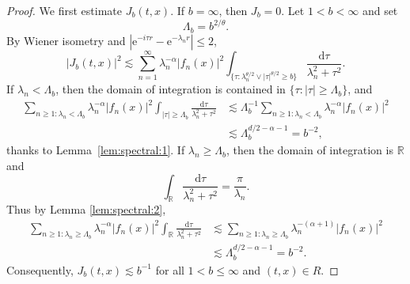 \documentclass[reqno]{amsart}
\DeclareMathOperator{\Var}{Var}
\newcommand{\R}{\mathbb R}
\renewcommand{\d}{\mathrm d}
\newcommand{\e}{\mathrm e}
\newcommand{\1}{\mathbf 1}
\numberwithin{equation}{section}
\theoremstyle{definition}
\begin{document}
\begin{proof}
We first estimate $J_b(t,x)$. If \(b=\infty\), then \(J_b=0\).
Let \(1<b<\infty\) and set
\[
	\Lambda_b=b^{2/\theta}.
\] 
By Wiener isometry and
\(|\e^{-i\tau r}-\e^{-\lambda_n r}|\le2\),
\[
    |J_b(t,x)|^2
    \lesssim
    \sum_{n=1}^\infty
    \lambda_n^{-\alpha}|f_n(x)|^2
    \int_{\{\tau:\lambda_n^{\theta/2}\vee|\tau|^{\theta/2}\ge b\}}
    \frac{\d\tau}{\lambda_n^2+\tau^2}.
\]
If \(\lambda_n<\Lambda_b\), then the domain of integration is contained in
\(\{\tau: |\tau|\ge\Lambda_b\}\), and
\[
\begin{aligned}
    \sum_{n \ge 1:\lambda_n<\Lambda_b}
    \lambda_n^{-\alpha}|f_n(x)|^2
    \int_{|\tau|\ge\Lambda_b}
    \frac{\d\tau}{\lambda_n^2+\tau^2}
    &\lesssim
    \Lambda_b^{-1}
    \sum_{n \ge 1: \lambda_n<\Lambda_b}\lambda_n^{-\alpha}|f_n(x)|^2  \\
    &\lesssim
    \Lambda_b^{d/2-\alpha-1}
    =
    b^{-2},
\end{aligned}
\]
thanks to Lemma~\ref{lem:spectral:1}. If \(\lambda_n\ge\Lambda_b\), then the domain of integration is $\R$ and
\[
    \int_\R\frac{\d\tau}{\lambda_n^2+\tau^2}=\frac{\pi}{\lambda_n}.
\]
Thus by Lemma \ref{lem:spectral:2},
\begin{align*}
    \sum_{n \ge 1: \lambda_n\ge\Lambda_b}
    \lambda_n^{-\alpha}|f_n(x)|^2
    \int_\R\frac{\d\tau}{\lambda_n^2+\tau^2}
    &\lesssim
    \sum_{n \ge 1:\lambda_n\ge\Lambda_b}
    \lambda_n^{-(\alpha+1)}|f_n(x)|^2\\
    &\lesssim
    \Lambda_b^{d/2-\alpha-1}
    =
    b^{-2}.
\end{align*}
Consequently, \(J_b(t,x)\lesssim b^{-1}\) for all $1<b\le \infty$ and $(t,x) \in R$.


\end{proof}
\end{document}
